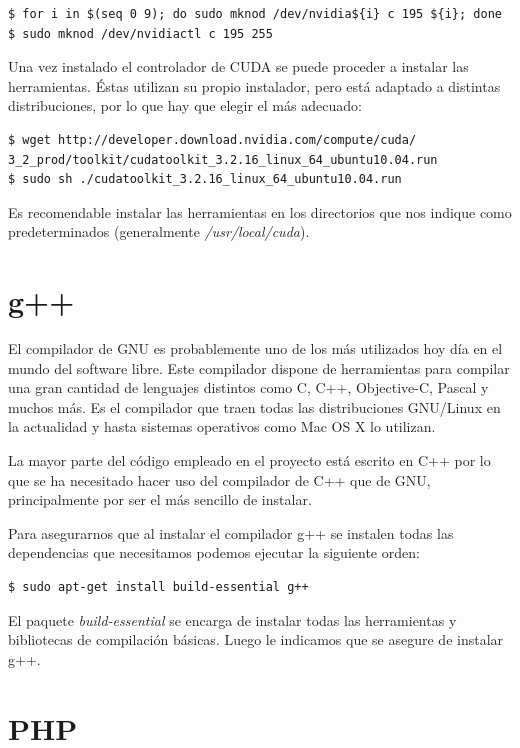 \begin{verbatim}
$ for i in $(seq 0 9); do sudo mknod /dev/nvidia${i} c 195 ${i}; done
$ sudo mknod /dev/nvidiactl c 195 255
\end{verbatim}

Una vez instalado el controlador de CUDA se puede proceder a instalar las herramientas. Éstas utilizan su propio instalador, pero está adaptado a distintas distribuciones, por lo que hay que elegir el más adecuado:

\begin{verbatim}
$ wget http://developer.download.nvidia.com/compute/cuda/
3_2_prod/toolkit/cudatoolkit_3.2.16_linux_64_ubuntu10.04.run
$ sudo sh ./cudatoolkit_3.2.16_linux_64_ubuntu10.04.run
\end{verbatim}

Es recomendable instalar las herramientas en los directorios que nos indique como predeterminados (generalmente \emph{/usr/local/cuda}).

\section{g++}

El compilador de GNU es probablemente uno de los más utilizados hoy día en el mundo del software libre. Este compilador dispone de herramientas para compilar una gran cantidad de lenguajes distintos como C, C++, Objective-C, Pascal y muchos más. Es el compilador que traen todas las distribuciones GNU/Linux en la actualidad y hasta sistemas operativos como Mac OS X lo utilizan.

La mayor parte del código empleado en el proyecto está escrito en C++ por lo que se ha necesitado hacer uso del compilador de C++ que de GNU, principalmente por ser el más sencillo de instalar.

Para asegurarnos que al instalar el compilador g++ se instalen todas las dependencias que necesitamos podemos ejecutar la siguiente orden:

\begin{verbatim}
$ sudo apt-get install build-essential g++
\end{verbatim}

El paquete \emph{build-essential} se encarga de instalar todas las herramientas y bibliotecas de compilación básicas. Luego le indicamos que se asegure de instalar g++.

\section{PHP}


